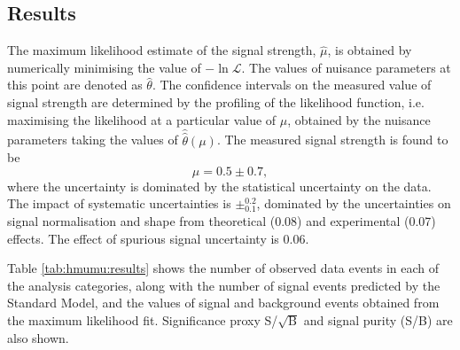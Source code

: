 \subsection{Results}

The maximum likelihood estimate of the signal strength, $\hat\mu$,
is obtained by numerically minimising the value of $-\ln{\mathcal{L}}$.
The values of nuisance parameters at this point are denoted as
$\hat\theta$. The confidence intervals on the measured value of signal
strength are determined by the profiling of the likelihood function,
i.e. maximising the likelihood at a particular value of $\mu$, obtained
by the nuisance parameters taking the values of $\hat{\hat\theta}(\mu)$.
The measured signal strength is found to be
\begin{equation}
\mu = 0.5 \pm 0.7,
\end {equation}
where the uncertainty is dominated by the statistical uncertainty on the
data. The impact of systematic uncertainties is $\pm^{0.2}_{0.1}$,
dominated by the uncertainties on signal normalisation and shape
from theoretical (0.08) and experimental (0.07) effects. The effect
of spurious signal uncertainty is 0.06.

Table \ref{tab:hmumu:results} shows the number of observed data events
in each of the analysis categories, along with the number of signal events
predicted by the Standard Model, and the values of signal and background
events obtained from the maximum likelihood fit. Significance proxy
S/$\sqrt{\text{B}}$ and signal purity (S/B) are also shown.

